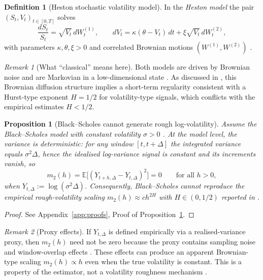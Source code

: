 \documentclass[12pt,a4paper]{article}
\theoremstyle{definition}
\newtheorem{definition}{Definition}[section]
\theoremstyle{plain}
\newtheorem{proposition}{Proposition}[section]
\theoremstyle{remark}
\newtheorem{remark}{Remark}[section]
\theoremstyle{plain}
\begin{document}
\begin{definition}[Heston stochastic volatility model]
\label{def:heston_model}
In the \emph{Heston model} the pair $(S_t,V_t)_{t\in[0,T]}$ solves
\[
\frac{dS_t}{S_t} = \sqrt{V_t}\, dW_t^{(1)},
\qquad
dV_t = \kappa(\theta - V_t)\,dt + \xi \sqrt{V_t}\, dW_t^{(2)},
\]
with parameters $\kappa,\theta,\xi>0$ and correlated Brownian motions $(W^{(1)},W^{(2)})$ \cite{Heston1993}.
\end{definition}

\begin{remark}[What ``classical'' means here]
\label{rem:classical_means_brownian}
Both models are driven by Brownian noise and are Markovian in a low-dimensional state \cite{BlackScholes1973,Heston1993}. 
As discussed in \cite{GatheralRough}, this Brownian diffusion structure implies a short-term regularity consistent with a Hurst-type exponent $H=1/2$ for volatility-type signals, which conflicts with the empirical estimates $H<1/2$.
\end{remark}

\begin{proposition}[Black--Scholes cannot generate rough log-volatility]
\label{prop:bs_no_roughness}
Assume the Black--Scholes model with constant volatility $\sigma>0$ \cite{BlackScholes1973}. 
At the model level, the variance is deterministic: for any window $[t,t+\Delta]$ the integrated variance equals $\sigma^2\Delta$, hence the idealised log-variance signal is constant and its increments vanish, so
\[
m_2(h)=\mathbb{E}\bigl[(Y_{t+h,\Delta}-Y_{t,\Delta})^2\bigr]=0
\qquad\text{for all }h>0,
\]
when $Y_{t,\Delta}:=\log(\sigma^2\Delta)$.
Consequently, Black--Scholes cannot reproduce the empirical rough-volatility scaling $m_2(h)\approx c h^{2H}$ with $H\in(0,1/2)$ reported in \cite{GatheralRough}.
\end{proposition}

\begin{proof}
See Appendix~\ref{app:proofs}, Proof of Proposition~\ref{prop:bs_no_roughness}.
\end{proof}

\begin{remark}[Proxy effects]
\label{rem:bs_proxy_effect}
If $Y_{t,\Delta}$ is defined empirically via a realised-variance proxy, then $m_2(h)$ need not be zero because the proxy contains sampling noise and window-overlap effects \cite{GatheralRough}. 
These effects can produce an apparent Brownian-type scaling $m_2(h)\propto h$ even when the true volatility is constant.
This is a property of the estimator, not a volatility roughness mechanism \cite{GatheralRough}.
\end{remark}
\end{document}

